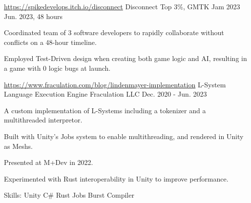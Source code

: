 \begin{cventries}
  \cventry
   {\href{https://spikedevelops.itch.io/disconnect}{https://spikedevelops.itch.io/disconnect}} %
    {Disconnect} %
    {Top 3\%, GMTK Jam 2023} %
    {Jun. 2023, 48 hours} %
    {
      \begin{cvitems} %
        \item {Coordinated team of 3 software developers to rapidly collaborate without conflicts on a 48-hour timeline.}
        \item {Employed Test-Driven design when creating both game logic and AI, resulting in a game with 0 logic bugs at launch.}
      \end{cvitems}
    }

  \cventry
   {\href{https://www.fraculation.com/blog/lindenmayer-implementation}{https://www.fraculation.com/blog/lindenmayer-implementation}} %
    {L-System Language Execution Engine} %
    {Fraculation LLC} %
    {Dec. 2020 - Jun. 2023} %
    {
      \begin{cvitems} %
        \item {A custom implementation of L-Systems including a tokenizer and a multithreaded interpretor.}
        \item {Built with Unity's Jobs system to enable multithreading, and rendered in Unity as Meshs.}
        \item {Presented at M+Dev in 2022.}
        \item {Experimented with Rust interoperability in Unity to improve performance.}
        \item {Skills: Unity \textbullet{} C\# \textbullet{} Rust \textbullet{} \textbullet{} Jobs \textbullet{} Burst Compiler}
      \end{cvitems}
    }

\end{cventries}
    